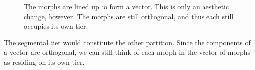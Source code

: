 \begin{figure}[!t]
\begin{mdframed}
%
%	
\label{fig:autoseg-to-bipartite}
\caption{The morphs are lined up to form a vector. This is only an aesthetic change, however. The morphs are still orthogonal, and thus each still occupies its own tier.}
\end{mdframed}
\end{figure} 
The segmental tier would constitute the other partition. 
Since the components of a vector are orthogonal, 
we can still think of each morph in the vector of morphs as residing on its own tier.

